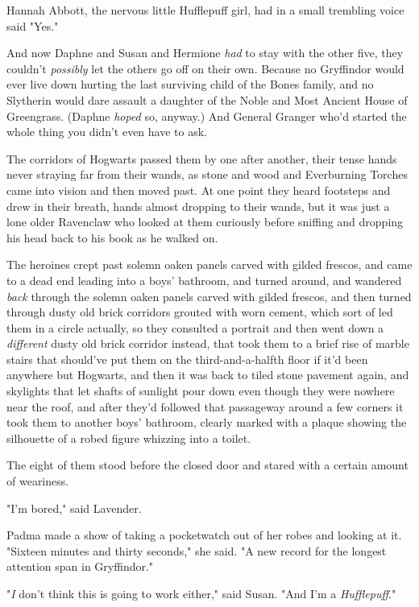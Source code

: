 Hannah Abbott, the nervous little Hufflepuff girl, had in a small trembling
voice said "Yes."

And now Daphne and Susan and Hermione \emph{had} to stay with the other five,
they couldn't \emph{possibly} let the others go off on their own. Because no
Gryffindor would ever live down hurting the last surviving child of the Bones
family, and no Slytherin would dare assault a daughter of the Noble and Most
Ancient House of Greengrass. (Daphne \emph{hoped} so, anyway.) And General
Granger who'd started the whole thing{\el} you didn't even have to ask.

The corridors of Hogwarts passed them by one after another, their tense hands
never straying far from their wands, as stone and wood and Everburning Torches
came into vision and then moved past. At one point they heard footsteps and
drew in their breath, hands almost dropping to their wands, but it was just a
lone older Ravenclaw who looked at them curiously before sniffing and dropping
his head back to his book as he walked on.

The heroines crept past solemn oaken panels carved with gilded frescos, and
came to a dead end leading into a boys' bathroom, and turned around, and
wandered \emph{back} through the solemn oaken panels carved with gilded
frescos, and then turned through dusty old brick corridors grouted with worn
cement, which sort of led them in a circle actually, so they consulted a
portrait and then went down a \emph{different} dusty old brick corridor
instead, that took them to a brief rise of marble stairs that should've put
them on the third-and-a-halfth floor if it'd been anywhere but Hogwarts, and
then it was back to tiled stone pavement again, and skylights that let shafts
of sunlight pour down even though they were nowhere near the roof, and after
they'd followed that passageway around a few corners it took them to another
boys' bathroom, clearly marked with a plaque showing the silhouette of a robed
figure whizzing into a toilet.

The eight of them stood before the closed door and stared with a certain amount
of weariness.

"I'm bored," said Lavender.

Padma made a show of taking a pocketwatch out of her robes and looking at it.
"Sixteen minutes and thirty seconds," she said. "A new record for the longest
attention span in Gryffindor."

"\emph{I} don't think this is going to work either," said Susan. "And I'm a
\emph{Hufflepuff}."

